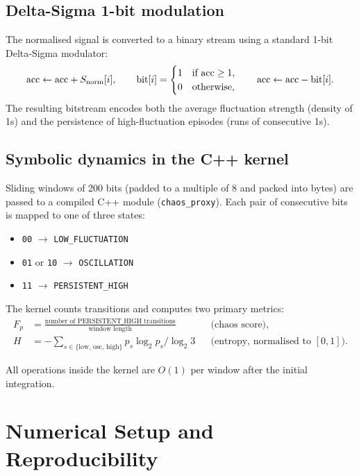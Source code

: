 \documentclass[useAMS,usenatbib,onecolumn]{mnras}
\begin{document}
\subsection{Delta-Sigma 1-bit modulation}
The normalised signal is converted to a binary stream using a standard 
1-bit Delta-Sigma modulator:
\begin{equation}
\text{acc} \leftarrow \text{acc} + S_{\rm norm}[i],\qquad
\text{bit}[i] = 
\begin{cases}
1 & \text{if acc} \ge 1, \\
0 & \text{otherwise},
\end{cases}
\qquad
\text{acc} \leftarrow \text{acc} - \text{bit}[i].
\end{equation}
The resulting bitstream encodes both the average fluctuation strength (density of 1s) and the persistence of high-fluctuation episodes (runs of consecutive 1s).

\subsection{Symbolic dynamics in the C++ kernel}
Sliding windows of 200 bits (padded to a multiple of 8 and packed into bytes) are passed to a compiled C++ module (\texttt{chaos\_proxy}). Each pair of consecutive bits is mapped to one of three states:

\begin{itemize}
\item \texttt{00} $\to$ \texttt{LOW\_FLUCTUATION}
\item \texttt{01} or \texttt{10} $\to$ \texttt{OSCILLATION}
\item \texttt{11} $\to$ \texttt{PERSISTENT\_HIGH}
\end{itemize}

The kernel counts transitions and computes two primary metrics:
\begin{align}
F_p &= \frac{\text{number of PERSISTENT\_HIGH transitions}}{\text{window length}} 
&& \text{(chaos score)}, \\
H &= -\sum_{s\in\{\text{low, osc, high}\}} p_s \log_2 p_s \Big/ \log_2 3 
&& \text{(entropy, normalised to $[0,1]$)}.
\end{align}

All operations inside the kernel are $O(1)$ per window after the initial integration.

\section{Numerical Setup and Reproducibility}
\label{sec:methods}
\end{document}
